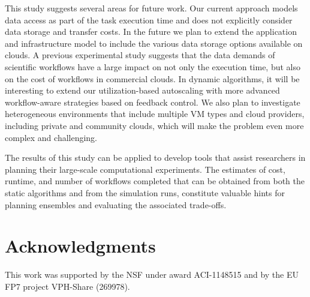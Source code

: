 \documentclass[preprint,5p]{elsarticle}
\begin{document}
This study suggests several areas for future work. Our current approach models
data access as part of the task execution time and does not explicitly consider data
storage and transfer costs. In the future we plan to extend the application
and infrastructure model to  include the various data storage options
available on clouds. A previous experimental study \cite{Juve2010} suggests
that the data demands of scientific workflows have a large impact on not only
the execution time, but also on the cost of workflows in commercial clouds. 
In dynamic algorithms, it will be interesting to extend our
utilization-based autoscaling with more advanced workflow-aware strategies
based on feedback control.
We also plan to investigate heterogeneous environments that include multiple VM
types and cloud providers, including private and community clouds, which will
make the problem even more complex and challenging.


The results of this study can be applied to develop tools that assist
researchers in planning their large-scale computational experiments. The
estimates of cost, runtime, and number of workflows completed that can be
obtained from both the static algorithms and from the simulation runs,
constitute valuable hints for planning ensembles and evaluating the
associated trade-offs.


\section*{Acknowledgments}
This work was supported by the NSF under award ACI-1148515 and
by the EU FP7 project VPH-Share (269978).

%

%







\end{document}
